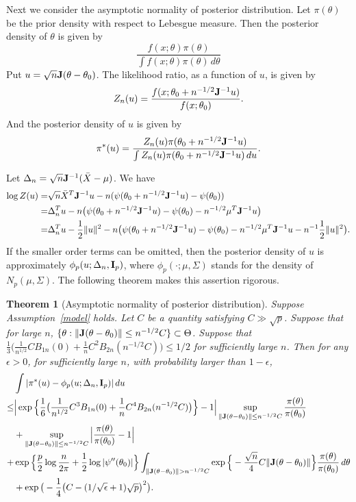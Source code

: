 \documentclass[11pt, letterpaper]{article}
\theoremstyle{plain}
\newtheorem{theorem}{\quad\quad Theorem}
\theoremstyle{definition}
\theoremstyle{remark}
\begin{document}
Next we consider the asymptotic normality of posterior distribution.
Let $\pi(\theta)$ be the prior density with respect to Lebesgue measure.
Then the posterior density of $\theta$ is given by
$$
\frac{
    f(x;\theta) \pi(\theta)
}{
    \int f(x;\theta) \pi(\theta)\, d \theta
}
$$
Put $u=\sqrt{n} \mathbf{J} (\theta-\theta_0)$.
The likelihood ratio, as a function of $u$, is given by
$$
Z_n(u)=\frac{f(x;\theta_0+n^{-1/2}\mathbf{J}^{-1}u)}{f(x;\theta_0)}.
$$
And the posterior density of $u$ is given by
$$
\pi^*(u)=\frac{
Z_n(u) \pi(\theta_0+n^{-1/2} \mathbf{J}^{-1}u)
}{
    \int Z_n(u) \pi(\theta_0+n^{-1/2} \mathbf{J}^{-1}u) \, du
}.
$$

Let $\Delta_n=\sqrt{n}\mathbf{J}^{-1}(\bar{X}-\mu)$. We have
$$
\begin{aligned}
    \log Z(u)=& \sqrt{n}\bar{X}^T \mathbf{J}^{-1}u-n(\psi(\theta_0+n^{-1/2}\mathbf{J}^{-1}u)-\psi(\theta_0))\\
    =&\Delta_n^T u-n\big(\psi(\theta_0+n^{-1/2}\mathbf{J}^{-1}u)-\psi(\theta_0)-n^{-1/2}\mu^T \mathbf{J}^{-1}u\big)\\
    =&\Delta_n^T u-\frac{1}{2}\|u\|^2-n\big(\psi(\theta_0+n^{-1/2}\mathbf{J}^{-1}u)-\psi(\theta_0)-n^{-1/2}\mu^T \mathbf{J}^{-1}u-n^{-1}\frac{1}{2} \|u\|^2\big).
\end{aligned}
$$
If the smaller order terms can be omitted, then the posterior density of $u$ is approximately $\phi_p(u;\Delta_n,\mathbf{I}_p)$, where $\phi_p(\cdot;\mu,\Sigma)$ stands for the density of $N_p(\mu,\Sigma)$.
The following theorem makes this assertion rigorous.
\begin{theorem}[Asymptotic normality of posterior distribution]
    Suppose Assumption~\ref{model} holds.
    Let $C$ be a quantity satisfying $C\gg \sqrt{p}$.
    Suppose that for large $n$, $\{\theta: \|\mathbf{J} (\theta-\theta_0)\|\leq n^{-1/2} C\}\subset \Theta$.
Suppose that $\frac{1}{3}\big(\frac{1}{n^{1/2}}C B_{1n}(0)+\frac{1}{n}C^2 B_{2n}(n^{-1/2}C)\big)\leq 1/2$ for sufficiently large $n$.
    Then for any $\epsilon>0$, for sufficiently large $n$, with probability larger than $1-\epsilon$, 
    $$
    \begin{aligned}
    &\int | \pi^*(u) -\phi_p(u;\Delta_n,\BI_p)| \, du\\
    \leq&
      \Big|
      \exp\Big\{\frac{1}{6}\big(
    \frac{1}{n^{1/2}}C^3 B_{1n}(0)+\frac{1}{n}C^4 B_{2n}(n^{-1/2}C)
      \big)\Big\}
        -
        1
          \Big| 
      \sup_{\|\BJ(\theta-\theta_0)\|\leq n^{-1/2} C}\frac{\pi(\theta)}{\pi(\theta_0)}\\
      &+
      \sup_{\|\BJ(\theta-\theta_0)\|\leq n^{-1/2} C}
      \Big|\frac{\pi(\theta)}{\pi(\theta_0)}-1\Big|
        \\
        +&
\exp\Big\{
    \frac{p}{2}\log \frac{n}{2\pi}+\frac{1}{2}\log |\psi''(\theta_0)|
    \Big\}
    \int_{\|\BJ(\theta-\theta_0)\|>n^{-1/2} C}
    \exp\Big\{
    -\frac{\sqrt{n}}{4} C\|\BJ(\theta-\theta_0)\|
    \Big\}
\frac{\pi(\theta)}{\pi(\theta_0)} \, d\theta\\
        &+
        \exp \big(-\frac{1}{4}\big(C-(1/\sqrt{\epsilon}+1)\sqrt{p}\big)^2 \big).
    \end{aligned}
    $$
\end{theorem}
\end{document}
